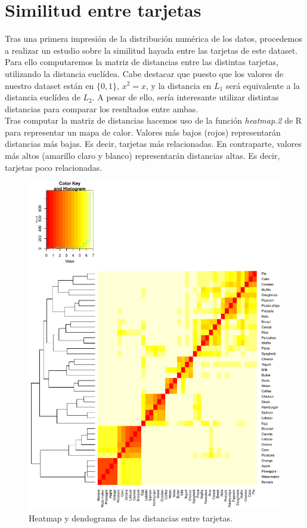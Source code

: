 \documentclass[a4paper]{article}
\begin{document}
\section{Similitud entre tarjetas}

Tras una primera impresión de la distribución numérica de los datos, procedemos a realizar un estudio sobre la similitud hayada entre las tarjetas de este dataset. Para ello computaremos la matriz de distancias entre las distintas tarjetas, utilizando la distancia euclídea. Cabe destacar que puesto que los valores de nuestro dataset están en $\{0,1\}$, $x^2 = x$, y la distancia en $L_1$ será equivalente a la distancia euclídea de $L_2$. A pesar de ello, sería interesante utilizar distintas distancias para comparar los resultados entre ambas. \\

Tras computar la matriz de distancias hacemos uso de la función \emph{heatmap.2} de R para representar un mapa de calor. Valores más bajos (rojos) representarán distancias más bajas. Es decir, tarjetas más relacionadas. En contraparte, valores más altos (amarillo claro y blanco) representarán distancias altas. Es decir, tarjetas poco relacionadas. \\

\begin{figure}[H]
	\includegraphics[scale=.6]{figures/heatmap}
	\centering
	\caption{Heatmap y dendograma de las distancias entre tarjetas.}
\end{figure}
\end{document}
